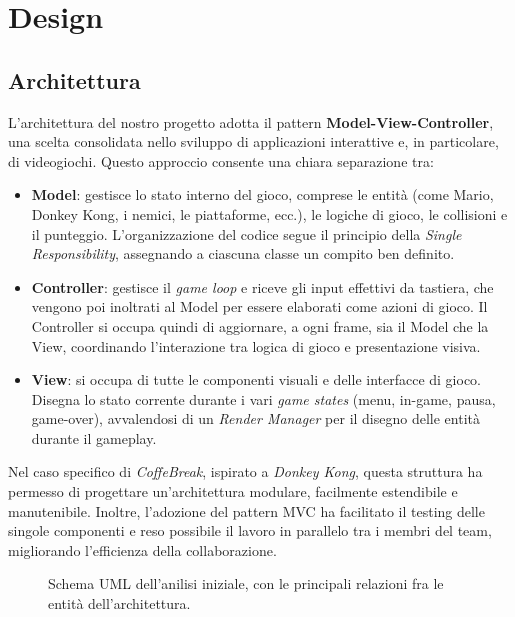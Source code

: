 \documentclass[a4paper,12pt]{report}
\begin{document}
\chapter{Design}
\section{Architettura}
L'architettura del nostro progetto adotta il pattern \textbf{Model-View-\newline Controller}, una scelta consolidata
nello sviluppo di applicazioni interattive e, in particolare, di videogiochi. Questo approccio consente una chiara separazione tra:

\begin{itemize}
	\item \textbf{Model}: gestisce lo stato interno del gioco, comprese le entità (come Mario, Donkey Kong, i nemici, le piattaforme, ecc.), le logiche di gioco, le collisioni e
	      il punteggio. L'organizzazione del codice segue il principio della \textit{Single Responsibility}, assegnando a ciascuna classe un compito ben definito.

	\item \textbf{Controller}: gestisce il \textit{game loop} e riceve gli input effettivi da tastiera, che vengono poi inoltrati al Model per essere elaborati come azioni di gioco. Il Controller
	      si occupa quindi di aggiornare, a ogni frame, sia il Model che la View, coordinando l'interazione tra logica di gioco e presentazione visiva.

	\item \textbf{View}: si occupa di tutte le componenti visuali e delle interfacce di gioco. Disegna lo stato corrente durante i vari \textit{game states} (menu, in-game, pausa, game-over),
	      avvalendosi di un \textit{Render Manager} per il disegno delle entità durante il gameplay.
\end{itemize}

Nel caso specifico di \textit{CoffeBreak}, ispirato a \textit{Donkey Kong}, questa struttura ha permesso di progettare un'architettura modulare, facilmente
estendibile e manutenibile. Inoltre, l'adozione del pattern MVC ha facilitato il testing delle singole componenti e reso possibile il lavoro in parallelo tra i membri
del team, migliorando l'efficienza della collaborazione.
\begin{figure}[H]
	\centering{}
	
	\caption{Schema UML dell'anilisi iniziale, con le principali relazioni fra le entità dell'architettura.}
	\label{img:View}
\end{figure}
\end{document}
